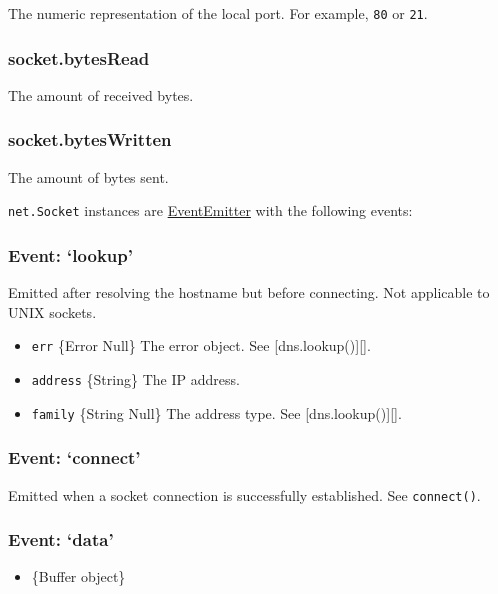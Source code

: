 The numeric representation of the local port. For example, \texttt{80}
or \texttt{21}.

\subsubsection{socket.bytesRead}\label{socket.bytesread}

The amount of received bytes.

\subsubsection{socket.bytesWritten}\label{socket.byteswritten}

The amount of bytes sent.

\texttt{net.Socket} instances are
\href{events.html\#events_class_events_eventemitter}{EventEmitter} with
the following events:

\subsubsection{Event: `lookup'}\label{event-lookup}

Emitted after resolving the hostname but before connecting. Not
applicable to UNIX sockets.

\begin{itemize}
\itemsep1pt\parskip0pt
\item
  \texttt{err} \{Error \textbar{} Null\} The error object. See
  {[}dns.lookup(){]}{[}{]}.
\item
  \texttt{address} \{String\} The IP address.
\item
  \texttt{family} \{String \textbar{} Null\} The address type. See
  {[}dns.lookup(){]}{[}{]}.
\end{itemize}

\subsubsection{Event: `connect'}\label{event-connect}

Emitted when a socket connection is successfully established. See
\texttt{connect()}.

\subsubsection{Event: `data'}\label{event-data}

\begin{itemize}
\itemsep1pt\parskip0pt
\item
  \{Buffer object\}
\end{itemize}

